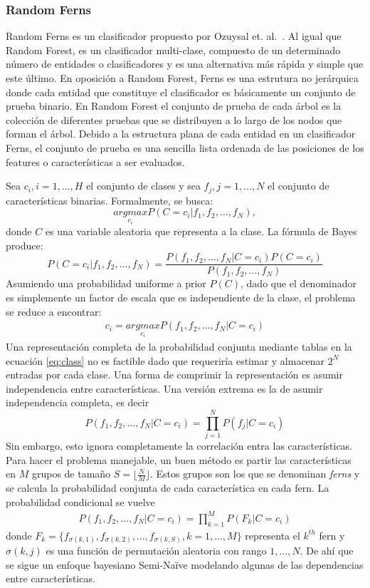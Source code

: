 \subsubsection{Random Ferns} 
\label{subsection:ferns}
	
		Random Ferns es un clasificador propuesto por Ozuysal et. al.~\cite{Ozuysal}. Al igual que Random Forest, es un clasificador multi-clase, compuesto de un determinado número de entidades o clasificadores y es una alternativa más rápida y simple que este último. En oposición a Random Forest, Ferns es una estrutura no jerárquica donde cada entidad que constituye el clasificador es básicamente un conjunto de prueba binario. En Random Forest el conjunto de prueba de cada árbol es la colección de diferentes pruebas que se distribuyen a lo largo de los nodos que forman el árbol. Debido a la estructura plana de cada entidad en un clasificador Ferns, el conjunto de prueba es una sencilla lista ordenada de las posiciones de los features o características a ser evaluados.
		
		Sea $c_i, i=1,\dots,H$ el conjunto de clases y  sea $f_j, j=1,\dots,N$ el conjunto de características binarias. Formalmente, se busca:
		$$\underset{c_i}{argmax}P(C=c_i \vert f_1,f_2,\dots,f_N),$$
		donde $C$ es una variable aleatoria que representa a la clase. La fórmula de Bayes produce:
		$$P(C=c_i \vert f_1,f_2,\dots,f_N) = \frac{P(f_1,f_2,\dots,f_N \vert C=c_i)P(C=c_i)}{P(f_1,f_2,\dots,f_N)}$$
		Asumiendo una probabilidad uniforme a prior $P(C)$, dado que el denominador es simplemente un factor de escala que es independiente de la clase, el problema se reduce a encontrar:
		\begin{align}\label{eq:class}
			c_i  = \underset{c_i}{argmax}P(f_1,f_2,\dots,f_N \vert C=c_i)
		\end{align}
		Una representación completa de la probabilidad conjunta mediante tablas en la ecuación \ref{eq:class} no es factible dado que requeriría estimar y almacenar $2^N$ entradas por cada clase. Una forma de comprimir la representación es asumir independencia entre características. Una versión extrema es la de asumir independencia completa, es decir
		$$P(f_1,f_2,\dots,f_N \vert C=c_i) = \prod_{j=1}^NP(f_j \vert C=c_i)$$
		Sin embargo, esto ignora completamente la correlación entra las características. Para hacer el problema manejable, un buen método es partir las características en $M$ grupos de tamaño $S=\lfloor \frac{N}{M} \rfloor$. Estos grupos son los que se denominan \textit{ferns} y se calcula la probabilidad conjunta de cada característica en cada fern. La probabilidad condicional se vuelve
		\begin{align}\label{eq:class2}
			P(f_1,f_2,\dots,f_N \vert C=c_i) = \prod_{k=1}^MP(F_k \vert C=c_i)
		\end{align}
		donde $F_k = \{ f_{\sigma(k,1)},f_{\sigma(k,2)},\dots,f_{\sigma(k,S)}, k=1,\dots,M \}$ representa el $k^{th}$ fern y $\sigma(k,j)$ es una función de permutación aleatoria con rango $1,\dots,N$. De ahí que se sigue un enfoque bayesiano Semi-Na\"{i}ve modelando algunas de las dependencias entre características.

